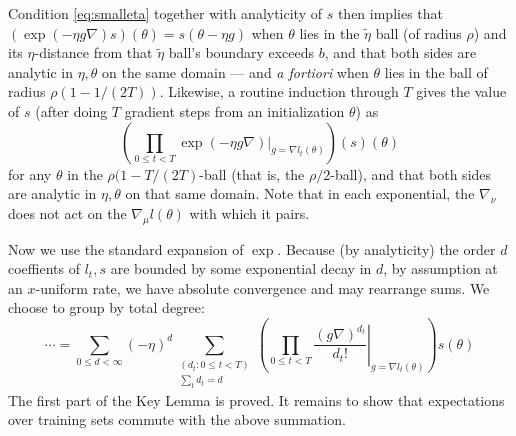 \documentclass{article}
\newcommand{\wrap}[1]{\left(#1\right)}
\begin{document}
            Condition \ref{eq:smalleta} together with analyticity of $s$ then
            implies that
            $
                \wrap{\exp(-\eta g \nabla) s}(\theta) = s(\theta - \eta g)
            $
            when $\theta$ lies in the $\tilde\eta$ ball (of radius $\rho$) and
            its $\eta$-distance from that $\tilde\eta$ ball's boundary exceeds
            $b$, and that both sides are analytic in $\eta, \theta$ on the 
            same domain --- and \emph{a fortiori} when $\theta$ lies in the
            ball of radius $\rho (1 - 1/(2T))$.
            Likewise, a routine induction through $T$ gives the value of $s$
            (after doing $T$ gradient steps from an initialization $\theta$) as
            $$
                \wrap{
                    \prod_{0\leq t<T}
                        \left.
                            \exp(-\eta g \nabla)
                        \right|_{g=\nabla l_t(\theta)}
                }
                (s)(\theta)
            $$
            for any $\theta$ in the $\rho (1-T/(2T)$-ball (that is, the
            $\rho/2$-ball), and that both sides are analytic in $\eta, \theta$
            on that same domain.  Note that in each exponential, the
            $\nabla_\nu$ does not act on the $\nabla_\mu l(\theta)$ with which
            it pairs.  

            Now we use the standard expansion of $\exp$.  Because (by
            analyticity) the order $d$ coeffients of $l_t, s$ are bounded by some
            exponential decay in $d$, by assumption at an $x$-uniform rate, we
            have absolute convergence and may rearrange sums.  We choose to
            group by total degree:
            \begin{equation} \label{eq:expansion}
                \cdots 
                =
                \sum_{0\leq d < \infty} (-\eta)^d
                \sum_{\substack{(d_t: 0\leq t<T) \\ \sum_t d_t = d}}
                \wrap{
                    \prod_{0 \leq t < T} \left.
                        \frac{(g \nabla)^{d_t}}{d_t!}
                    \right|_{g=\nabla l_t(\theta)}
                } s (\theta)
            \end{equation}
            The first part of the Key Lemma is proved.  It remains to show that
            expectations over training sets commute with the above summation.
\end{document}
